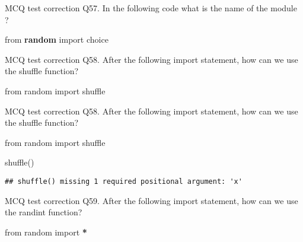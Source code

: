 \documentclass[
  8pt,
  ignorenonframetext,
]{beamer}
\newenvironment{Shaded}{\begin{snugshade}}{\end{snugshade}}
\newcommand{\ImportTok}[1]{#1}
\newcommand{\NormalTok}[1]{#1}
\newcommand{\OperatorTok}[1]{\textcolor[rgb]{0.81,0.36,0.00}{\textbf{#1}}}
\begin{document}
\begin{frame}{MCQ test correction}
\protect\hypertarget{mcq-test-correction-113}{}
Q57. In the following code what is the name of the module ?

from \textbf{random} import choice
\end{frame}

\begin{frame}[fragile]{MCQ test correction}
\protect\hypertarget{mcq-test-correction-114}{}
Q58. After the following import statement, how can we use the shuffle
function?

\begin{Shaded}
\begin{Highlighting}[]
\ImportTok{from}\NormalTok{ random }\ImportTok{import}\NormalTok{ shuffle}
\end{Highlighting}
\end{Shaded}
\end{frame}

\begin{frame}[fragile]{MCQ test correction}
\protect\hypertarget{mcq-test-correction-115}{}
Q58. After the following import statement, how can we use the shuffle
function?

\begin{Shaded}
\begin{Highlighting}[]
\ImportTok{from}\NormalTok{ random }\ImportTok{import}\NormalTok{ shuffle}

\NormalTok{shuffle()}
\end{Highlighting}
\end{Shaded}

\begin{verbatim}
## shuffle() missing 1 required positional argument: 'x'
\end{verbatim}
\end{frame}

\begin{frame}[fragile]{MCQ test correction}
\protect\hypertarget{mcq-test-correction-116}{}
Q59. After the following import statement, how can we use the randint
function?

\begin{Shaded}
\begin{Highlighting}[]
\ImportTok{from}\NormalTok{ random }\ImportTok{import} \OperatorTok{*}
\end{Highlighting}
\end{Shaded}
\end{frame}
\end{document}
